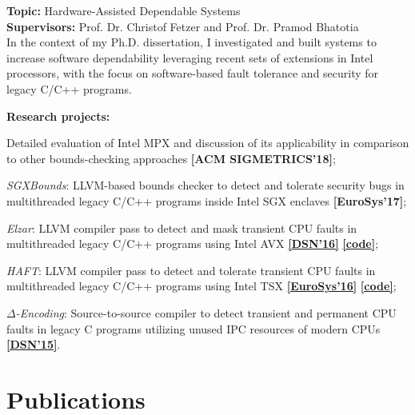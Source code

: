 \documentclass[letterpaper]{article}
\renewenvironment{itemize}{
  \begin{list}{}{
    \setlength{\leftmargin}{1.5em}
  }
}{
  \end{list}
}
\begin{document}
\begin{itemize}
\item {\bf Topic:} Hardware-Assisted Dependable Systems\\
{\bf Supervisors:} Prof. Dr. Christof Fetzer and Prof. Dr. Pramod Bhatotia\vspace{-13pt}\\

In the context of my Ph.D. dissertation, I investigated and built systems to increase software dependability leveraging recent sets of extensions in Intel processors, with the focus on software-based fault tolerance and security for legacy C/C++ programs. %

{\bf Research projects:}
	\begin{itemize}%
		\item Detailed evaluation of Intel MPX and discussion of its applicability in comparison to other bounds-checking approaches {\bf [ACM SIGMETRICS'18]};
		\item \emph{SGXBounds}: LLVM-based bounds checker to detect and tolerate security bugs in multithreaded legacy C/C++ programs inside Intel SGX enclaves {\bf [EuroSys'17]};
		\item \emph{Elzar}: LLVM compiler pass to detect and mask transient CPU faults in multithreaded legacy C/C++ programs using Intel AVX \href{http://se.inf.tu-dresden.de/pubs/papers/Kuvaiskii2016elzar.pdf}{{\bf [DSN'16]}} \href{https://github.com/tudinfse/elzar}{{\bf [code]}};
		\item \emph{HAFT}: LLVM compiler pass to detect and tolerate transient CPU faults in multithreaded legacy C/C++ programs using Intel TSX \href{http://se.inf.tu-dresden.de/pubs/papers/Kuvaiskii2016HAFT.pdf}{{\bf [EuroSys'16]}} \href{https://github.com/tudinfse/haft}{{\bf [code]}};
		\item \emph{$\Delta$-Encoding}: Source-to-source compiler to detect transient and permanent CPU faults in legacy C programs utilizing unused IPC resources of modern CPUs \href{http://se.inf.tu-dresden.de/pubs/papers/DELTAENC.pdf}{{\bf [DSN'15]}}.
	\end{itemize}%
\end{itemize}%


\section*{Publications}
\end{document}
